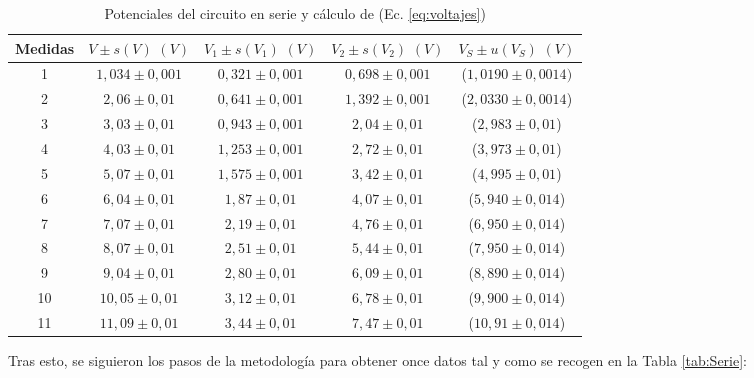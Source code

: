 \documentclass[11pt]{report}
\begin{document}
\begin{refsection}
\begin{table}[ht]
\centering
\begin{tabular}{|c|c|c|c|c|}
\hline
Medidas &$V \pm s(V)\hspace{4pt}(V)$&$V_1 \pm s(V_1)\hspace{4pt}(V)$&$V_2 \pm s(V_2)\hspace{4pt}(V)$&$V_S\pm u(V_S)\hspace{4pt}(V)$\\
\hline
1 & $1,034 \pm 0,001$ &$0,321 \pm 0,001$& $0,698 \pm 0,001$ &($1,0190\pm 0,0014)$\\
2 & $2,06 \pm 0,01$ &$0,641 \pm 0,001$& $1,392 \pm 0,001$ &($2,0330\pm 0,0014$) \\
3 & $3,03 \pm 0,01$ &$0,943 \pm 0,001$& $2,04 \pm 0,01$ &($2,983\pm 0,01$) \\
4 & $4,03 \pm 0,01$ &$1,253 \pm 0,001$& $2,72 \pm 0,01$ & ($3,973 \pm 0,01$) \\
5 & $5,07 \pm 0,01$ &$1,575 \pm 0,001$& $3,42 \pm 0,01$ &($4,995 \pm 0,01$) \\
6 & $6,04 \pm 0,01$ &$1,87 \pm 0,01$& $4,07 \pm 0,01$ & ($5,940 \pm 0,014$) \\
7 & $7,07 \pm 0,01$ &$2,19 \pm 0,01$& $4,76 \pm 0,01$ & ($6,950 \pm 0,014$)\\
8 & $8,07 \pm 0,01$ &$2,51 \pm 0,01$& $5,44 \pm 0,01$ &($7,950\pm 0,014$) \\
9 & $9,04 \pm 0,01$ &$2,80 \pm 0,01$& $6,09 \pm 0,01$ &($8,890\pm 0,014$) \\
10 & $10,05 \pm 0,01$ &$3,12 \pm 0,01$& $6,78 \pm 0,01$ & ($9,900\pm 0,014$)\\
11 & $11,09 \pm 0,01$ &$3,44 \pm 0,01$& $7,47 \pm 0,01$ & ($10,91 \pm 0,014$)\\
\hline
\end{tabular}
\caption{Potenciales del circuito en serie y cálculo de (Ec. \ref{eq:voltajes})}
\label{tab:Serie2}
\end{table}

Tras esto, se siguieron los pasos de la metodología para obtener once datos tal y como se recogen en la Tabla \ref{tab:Serie}:


\end{refsection}
\end{document}
